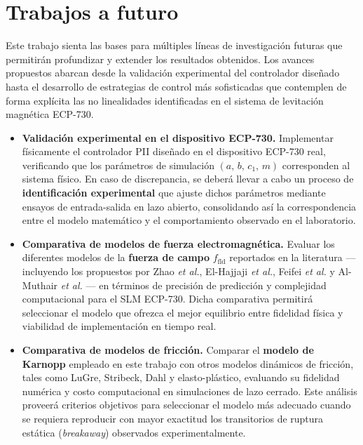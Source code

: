 \section{Trabajos a futuro}

Este trabajo sienta las bases para múltiples líneas de investigación futuras que permitirán
profundizar y extender los resultados obtenidos. Los avances propuestos abarcan desde la
validación experimental del controlador diseñado hasta el desarrollo de estrategias de control
más sofisticadas que contemplen de forma explícita las no linealidades identificadas en el
sistema de levitación magnética ECP-730.

\begin{itemize}

    \item \textbf{Validación experimental en el dispositivo ECP-730.}
    Implementar físicamente el controlador PII diseñado en el dispositivo ECP-730 real,
    verificando que los parámetros de simulación $(a,\, b,\, c_1,\, m)$ corresponden al
    sistema físico. En caso de discrepancia, se deberá llevar a cabo un proceso de
    \textbf{identificación experimental} que ajuste dichos parámetros mediante ensayos de
    entrada-salida en lazo abierto, consolidando así la correspondencia entre el modelo
    matemático y el comportamiento observado en el laboratorio.

    \item \textbf{Comparativa de modelos de fuerza electromagnética.}
    Evaluar los diferentes modelos de la \textbf{fuerza de campo} $f_{\mathrm{fld}}$
    reportados en la literatura --- incluyendo los propuestos por Zhao \textit{et al.},
    El-Hajjaji \textit{et al.}, Feifei \textit{et al.} y Al-Muthair \textit{et al.} ---
    en términos de precisión de predicción y complejidad computacional para el SLM ECP-730.
    Dicha comparativa permitirá seleccionar el modelo que ofrezca el mejor equilibrio entre
    fidelidad física y viabilidad de implementación en tiempo real.

    \item \textbf{Comparativa de modelos de fricción.}
    Comparar el \textbf{modelo de Karnopp} empleado en este trabajo con otros modelos
    dinámicos de fricción, tales como LuGre, Stribeck, Dahl y elasto-plástico, evaluando
    su fidelidad numérica y costo computacional en simulaciones de lazo cerrado. Este
    análisis proveerá criterios objetivos para seleccionar el modelo más adecuado cuando
    se requiera reproducir con mayor exactitud los transitorios de ruptura estática
    (\textit{breakaway}) observados experimentalmente.


\end{itemize}
